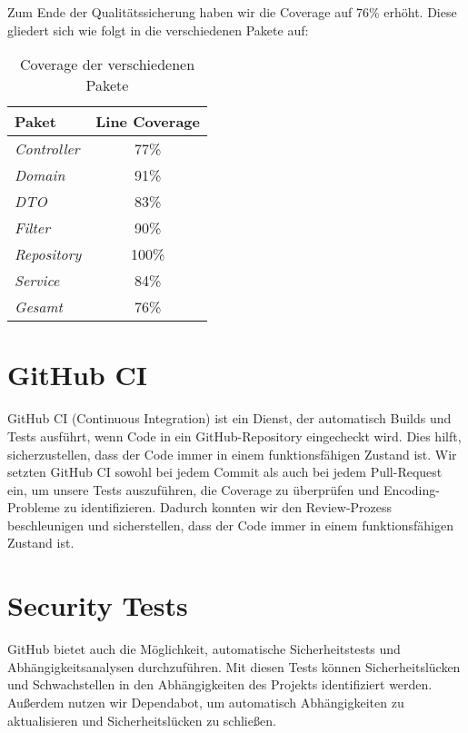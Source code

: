Zum Ende der Qualitätssicherung haben wir die Coverage auf 76\% erhöht.
Diese gliedert sich wie folgt in die verschiedenen Pakete auf:

\begin{table}[h]
    \centering
    \renewcommand{\arraystretch}{1.3}
    \begin{tabular}{l|c}
        \textbf{Paket} & \textbf{Line Coverage} \\
        \hline
        \hline
        \textit{Controller}  & 77\% \\
        \textit{Domain}      & 91\% \\
        \textit{DTO}         & 83\% \\
        \textit{Filter}      & 90\% \\
        \textit{Repository}  & 100\% \\
        \textit{Service}     & 84\% \\
        \hline
        \textit{Gesamt}      & 76\% \\
    \end{tabular}
    \caption{Coverage der verschiedenen Pakete}
    \label{tab:progress}
\end{table}


\section{GitHub CI}
GitHub CI (Continuous Integration) ist ein Dienst, der automatisch Builds und Tests ausführt, wenn Code in ein GitHub-Repository eingecheckt wird.
Dies hilft, sicherzustellen, dass der Code immer in einem funktionsfähigen Zustand ist.
Wir setzten GitHub CI sowohl bei jedem Commit als auch bei jedem Pull-Request ein,
um unsere Tests auszuführen, die Coverage zu überprüfen und Encoding-Probleme zu identifizieren.
Dadurch konnten wir den Review-Prozess beschleunigen und sicherstellen, dass der Code immer in einem funktionsfähigen Zustand ist.

\section{Security Tests}
GitHub bietet auch die Möglichkeit, automatische Sicherheitstests und Abhängigkeitsanalysen durchzuführen.
Mit diesen Tests können Sicherheitslücken und Schwachstellen in den Abhängigkeiten des Projekts identifiziert werden.
Außerdem nutzen wir Dependabot, um automatisch Abhängigkeiten zu aktualisieren und Sicherheitslücken zu schließen.

